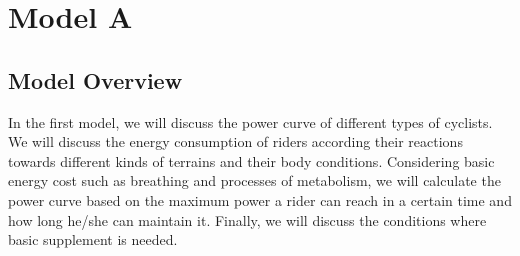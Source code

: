 \documentclass[12pt]{article}
\theoremstyle{definition}
\theoremstyle{remark}
\numberwithin{equation}{section}
\begin{document}
	\section{Model A}
	\subsection{Model Overview}
	In the first model, we will discuss the power curve of different types of cyclists. We will discuss the energy consumption of riders according their reactions towards different kinds of terrains and their body conditions. Considering basic energy cost such as breathing and processes of metabolism, we will calculate the power curve based on the maximum power a rider can reach in a certain time and how long he/she can maintain it. Finally, we will discuss the conditions where basic supplement is needed.
\end{document}
